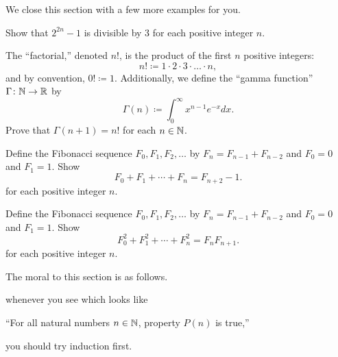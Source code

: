 \documentclass[../notes.tex]{subfiles}
\begin{document}

We close this section with a few more examples for you.
\begin{exercise}
    Show that $2^{2n} - 1$ is divisible by 3 for each positive integer $n$.
\end{exercise}
\begin{exercise}
    The ``factorial,'' denoted $n!$, is the product of the first $n$ positive integers:
    \[n!\coloneqq1\cdot2\cdot3\cdot\ldots\cdot n,\]
    and by convention, $0!\coloneqq1$. Additionally, we define the ``gamma function'' $\Gamma\colon \mathbb N \to \mathbb R$ by
    \begin{equation*}
        \Gamma(n) \coloneqq \int_0^\infty x^{n - 1}e^{-x} dx.
    \end{equation*}
    Prove that $\Gamma(n + 1) = n!$ for each $n \in \mathbb N$.
\end{exercise}
\begin{exercise}
    Define the Fibonacci sequence $F_0,F_1,F_2,\ldots$ by $F_n=F_{n-1}+F_{n-2}$ and $F_0=0$ and $F_1=1$. Show
    \[F_0+F_1+\cdots+F_n=F_{n+2}-1.\]
    for each positive integer $n$.
\end{exercise}
\begin{exercise} \label{hw:fib}
    Define the Fibonacci sequence $F_0,F_1,F_2,\ldots$ by $F_n=F_{n-1}+F_{n-2}$ and $F_0=0$ and $F_1=1$. Show
    \[F_0^2+F_1^2+\cdots+F_n^2=F_nF_{n+1}.\]
    for each positive integer $n$.
\end{exercise}
The moral to this section is as follows.
\begin{idea}
    whenever you see which looks like
    \begin{center}
        ``For all natural numbers $n \in \mathbb N$, property $P(n)$ is true,''
    \end{center}
    you should try induction first.
\end{idea}
\end{document}
